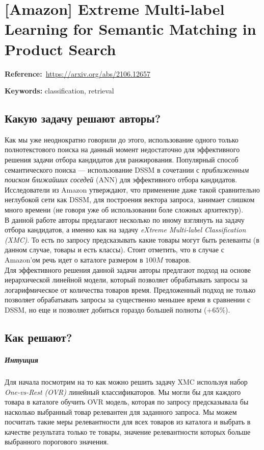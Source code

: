 \chapter{[Amazon] Extreme Multi-label Learning for Semantic Matching in Product Search}

\textbf{Reference:}~\url{https://arxiv.org/abs/2106.12657}

\textbf{Keywords:} classification, retrieval

\section*{Какую задачу решают авторы?}

Как мы уже неоднократно говорили до этого, использование одного только полнотекстового поиска на данный момент недостаточно для эффективного решения задачи отбора кандидатов для ранжирования.
Популярный способ семантического поиска --- использование DSSM в сочетании с \textit{приближенным поиском ближайших соседей} (ANN) для эффективного отбора кандидатов. \\

Исследователи из Amazon утверждают, что применение даже такой сравнительно неглубокой сети как DSSM, для построения вектора запроса, занимает слишком много времени (не говоря уже об использовании боле сложных архитектур). \\

В данной работе авторы предлагают несколько по иному взглянуть на задачу отбора кандидатов, а именно как на задачу \textit{eXtreme Multi-label Classification (XMC)}. 
То есть по запросу предсказывать какие товары могут быть релеванты (в данном случае, товары и есть классы).
Стоит отметить, что в случае с Amazon'ом речь идет о каталоге размером в $100M$ товаров.  \\

Для эффективного решения данной задачи авторы предлгают подход на основе иерархической линейной модели, который позволяет обрабатывать запросы за логарифмическое от количества товаров время.
Предложенный подход не только позволяет обрабатывать запросы за существенно меньшее время в сравнении с DSSM, но еще и позволяет добиться гораздо большей полноты ($+65\%$).

\section*{Как решают?}

\paragraph{Интуиция} Для начала посмотрим на то как можно решить задачу XMC используя набор \textit{One-vs-Rest (OVR)} линейный классификаторов.
Мы могли бы для каждого товара в каталоге обучить OVR модель, которая по запросу предсказывала бы насколько выбранный товар релевантен для заданного запроса.
Мы можем посчитать такие меры релевантности для всех товаров из каталога и выбрать в качестве результата только те товары, значение релевантности которых больше выбранного порогового значения. \\

